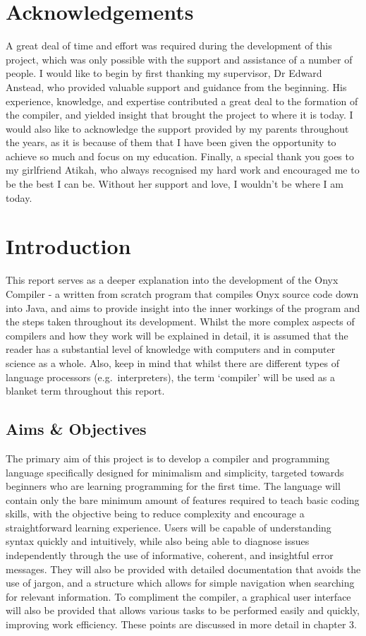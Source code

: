 \documentclass[
]{report}
\begin{document}
\chapter*{Acknowledgements}
A great deal of time and effort was required during the development of
this project, which was only possible with the support and assistance of
a number of people. I would like to begin by first thanking my
supervisor, Dr Edward Anstead, who provided valuable support and
guidance from the beginning. His experience, knowledge, and expertise
contributed a great deal to the formation of the compiler, and yielded
insight that brought the project to where it is today. I would also like
to acknowledge the support provided by my parents throughout the years,
as it is because of them that I have been given the opportunity to
achieve so much and focus on my education. Finally, a special thank you
goes to my girlfriend Atikah, who always recognised my hard work and
encouraged me to be the best I can be. Without her support and love, I
wouldn't be where I am today.

\setcounter{tocdepth}{2}
\tableofcontents

\listoffigures

\chapter{Introduction}
This report serves as a deeper explanation into the development of the
Onyx Compiler - a written from scratch program that compiles Onyx source
code down into Java, and aims to provide insight into the inner workings
of the program and the steps taken throughout its development. Whilst
the more complex aspects of compilers and how they work will be
explained in detail, it is assumed that the reader has a substantial
level of knowledge with computers and in computer science as a whole.
Also, keep in mind that whilst there are different types of language
processors (e.g.~interpreters), the term `compiler' will be used as a
blanket term throughout this report.

\section{Aims \& Objectives}
The primary aim of this project is to develop a compiler and programming
language specifically designed for minimalism and simplicity, targeted
towards beginners who are learning programming for the first time. The
language will contain only the bare minimum amount of features required
to teach basic coding skills, with the objective being to reduce
complexity and encourage a straightforward learning experience. Users
will be capable of understanding syntax quickly and intuitively, while
also being able to diagnose issues independently through the use of
informative, coherent, and insightful error messages. They will also be
provided with detailed documentation that avoids the use of jargon, and
a structure which allows for simple navigation when searching for
relevant information. To compliment the compiler, a graphical user
interface will also be provided that allows various tasks to be
performed easily and quickly, improving work efficiency. These points
are discussed in more detail in chapter 3.
\end{document}

